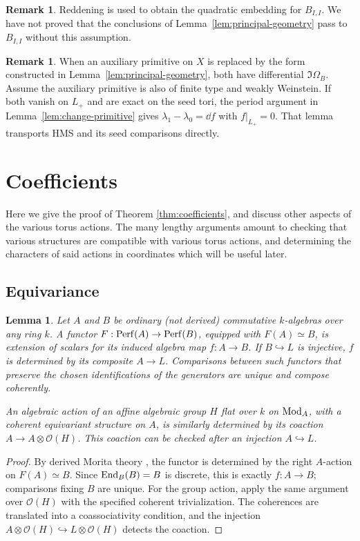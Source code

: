 \documentclass[12pt, letter]{amsart}
\newtheorem{lemma}[theorem]{Lemma}
\theoremstyle{definition}
\newtheorem{remark}[theorem]{Remark}
\newcommand{\OO}{\mathcal O}
\numberwithin{equation}{section}
\begin{document}
\begin{remark}
Reddening is used to obtain the quadratic embedding for $B_{I,I}$.
We have not proved that the conclusions of Lemma~\ref{lem:principal-geometry}
pass to $B_{I,I}$ without this assumption.
\end{remark}

\begin{remark}\label{rem:rebuilding}
When an auxiliary primitive on $X$ is replaced by the form constructed
in Lemma~\ref{lem:principal-geometry}, both have differential
$\Im\Omega_B$. Assume the auxiliary primitive is also of finite type
and weakly Weinstein. If both vanish on $L_+$ and are exact on the seed tori,
the period argument in Lemma~\ref{lem:change-primitive} gives
$\lambda_1-\lambda_0=\dd f$ with $f|_{L_+}=0$.
That lemma transports HMS and its seed comparisons directly.
\end{remark}



\section{Coefficients} \label{sec: coefficients}

Here we give the proof of Theorem \ref{thm:coefficients}, and discuss other aspects of the various torus actions.  The many lengthy arguments amount to checking that various structures are compatible with various torus actions, and determining the characters of said actions in coordinates which will be useful later.  

\subsection{Equivariance}

\begin{lemma}\label{lem:marked-functors} 
Let $A$ and $B$ be ordinary (not derived) commutative $k$-algebras over any ring $k$.
A functor $F:\mathrm{Perf}(A)\to\mathrm{Perf}(B)$,
equipped with $F(A)\simeq B$, is extension of scalars for
its induced algebra map $f:A\to B$.
If $B\hookrightarrow L$ is injective, $f$ is determined by
its composite $A\to L$.
Comparisons between such functors that preserve the chosen
identifications of the generators are unique and compose coherently.

An algebraic action of an affine algebraic group $H$
flat over $k$ on
$\operatorname{Mod}_A$, with a coherent equivariant structure on $A$,
is similarly determined by its coaction
$A\to A\otimes\OO(H)$.
This coaction can be checked after an injection $A\hookrightarrow L$.  
\end{lemma}
\begin{proof}
By derived Morita theory \cite[Corollary~7.6]{Toen}, the functor
is determined by the right $A$-action on $F(A)\simeq B$.
Since $\operatorname{End}_B(B)=B$ is discrete, this is exactly $f:A\to B$;
comparisons fixing $B$ are unique. For the group action, apply
the same argument over $\OO(H)$ with the specified coherent
trivialization. The coherences are translated into a coassociativity condition, and the injection
$A\otimes\OO(H)\hookrightarrow L\otimes\OO(H)$ detects the coaction.  
\end{proof}
\end{document}

